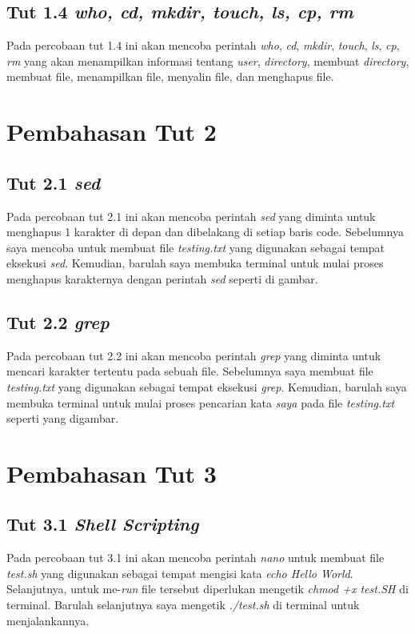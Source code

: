 \documentclass[11pt,a4paper]{article}
\begin{document}
\subsection{Tut 1.4 \textit{who, cd, mkdir, touch, ls, cp, rm}}
	Pada percobaan tut 1.4 ini akan mencoba perintah \textit{who}, \textit{cd}, \textit{mkdir}, \textit{touch}, \textit{ls}, \textit{cp}, 
	\textit{rm} yang akan menampilkan informasi tentang \textit{user}, \textit{directory}, membuat \textit{directory}, membuat file, menampilkan file, 
	menyalin file, dan menghapus file.
	

\newpage
\section{Pembahasan Tut 2}
\subsection{Tut 2.1 \textit{sed}}
	Pada percobaan tut 2.1 ini akan mencoba perintah \textit{sed} yang diminta untuk menghapus 1 karakter di depan dan dibelakang
	di setiap baris code. Sebelumnya saya mencoba untuk membuat file \textit{testing.txt} yang digunakan sebagai tempat eksekusi \textit{sed}.
	Kemudian, barulah saya membuka terminal untuk mulai proses menghapus karakternya dengan perintah \textit{sed} seperti di gambar.
	

\subsection{Tut 2.2 \textit{grep}}
	Pada percobaan tut 2.2 ini akan mencoba perintah \textit{grep} yang diminta untuk mencari karakter tertentu pada sebuah file.
	Sebelumnya saya membuat file \textit{testing.txt} yang digunakan sebagai tempat eksekusi \textit{grep}. Kemudian, barulah saya membuka terminal 
	untuk mulai proses pencarian kata \textit{saya} pada file \textit{testing.txt} seperti yang digambar.
	

\section{Pembahasan Tut 3}
\subsection{Tut 3.1 \textit{Shell Scripting}}
	Pada percobaan tut 3.1 ini akan mencoba perintah \textit{nano} untuk membuat file \textit{test.sh} yang digunakan sebagai tempat mengisi
	kata \textit{echo Hello World}. Selanjutnya, untuk me-\textit{run} file tersebut diperlukan mengetik \textit{chmod +x test.SH} di terminal. Barulah 
	selanjutnya saya mengetik \textit{./test.sh} di terminal untuk menjalankannya.
	
\end{document}
